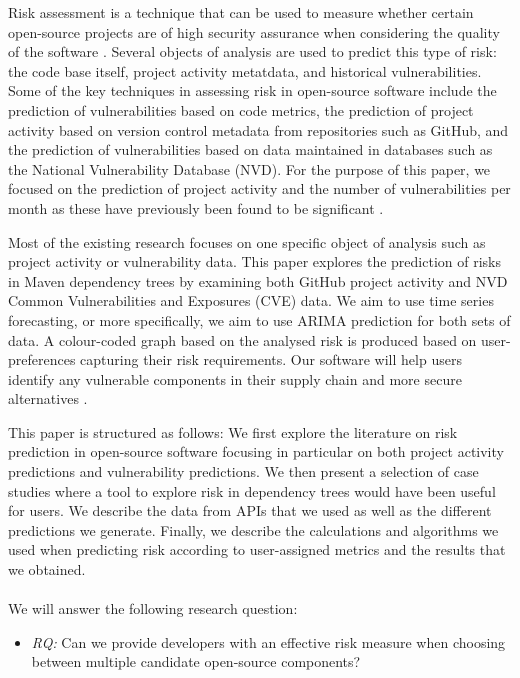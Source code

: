 \documentclass[conference]{IEEEtran}
\begin{document}
Risk assessment is a technique that can be used to measure whether certain open-source projects are of high security assurance when considering the quality of the software \cite{abunadi_towards_2015}. Several objects of analysis are used to predict this type of risk: the code base itself, project activity metatdata, and historical vulnerabilities. Some of the key techniques in assessing risk in open-source software include the prediction of vulnerabilities based on code metrics, the prediction of project activity based on version control metadata from repositories such as GitHub, and the prediction of vulnerabilities based on data maintained in databases such as the National Vulnerability Database (NVD). For the purpose of this paper, we focused on the prediction of project activity and the number of vulnerabilities per month as these have previously been found to be significant \cite{xia_predicting_2022, s_wu_vulnerability_2020}. 

Most of the existing research focuses on one specific object of analysis such as project activity or vulnerability data. This paper explores the prediction of risks in Maven dependency trees by examining both GitHub project activity and NVD Common Vulnerabilities and Exposures (CVE) data. We aim to use time series forecasting, or more specifically, we aim to use ARIMA prediction for both sets of data. A colour-coded graph based on the analysed risk is produced based on user-preferences capturing their risk requirements. Our software will help users identify any vulnerable components in their supply chain and more secure alternatives \cite{noauthor_open_nodate}. 

This paper is structured as follows: We first explore the literature on risk prediction in open-source software focusing in particular on both project activity predictions and vulnerability predictions. We then present a selection of case studies where a tool to explore risk in dependency trees would have been useful for users. We describe the data from APIs that we used as well as the different predictions we generate. Finally, we describe the calculations and algorithms we used when predicting risk according to user-assigned metrics and the results that we obtained. 
\\\\
We will answer the following research question:\\

\begin{itemize}
    \item \textit{RQ:} Can we provide developers with an effective risk measure when choosing between multiple candidate open-source components?\\
\end{itemize}
\end{document}
